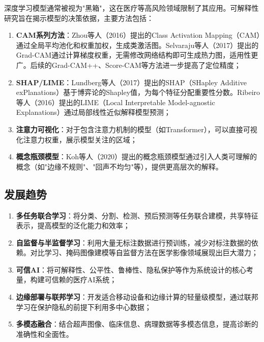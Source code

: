 \documentclass[supercite]{Hust-undergraduate-kaiti}
\theoremstyle{definition}
\begin{document}
深度学习模型通常被视为"黑箱"，这在医疗等高风险领域限制了其应用。可解释性研究旨在揭示模型的决策依据，主要方法包括：

\begin{enumerate}
    \item \textbf{CAM系列方法}：Zhou等人（2016）提出的Class Activation Mapping（CAM）通过全局平均池化和权重加权，生成类激活图。Selvaraju等人（2017）提出的Grad-CAM\cite{ref5}通过计算梯度权重，无需修改网络结构即可生成热力图，适用性更广。后续的Grad-CAM++、Score-CAM等方法进一步提高了定位精度；
    
    \item \textbf{SHAP/LIME}：Lundberg等人（2017）提出的SHAP（SHapley Additive exPlanations）基于博弈论的Shapley值，为每个特征分配重要性分数。Ribeiro等人（2016）提出的LIME（Local Interpretable Model-agnostic Explanations）通过局部线性近似解释模型预测；
    
    \item \textbf{注意力可视化}：对于包含注意力机制的模型（如Transformer），可以直接可视化注意力权重，展示模型关注的区域；
    
    \item \textbf{概念瓶颈模型}：Koh等人（2020）提出的概念瓶颈模型通过引入人类可理解的概念（如"边缘不规则"、"回声不均匀"等），提供更高层次的解释。
\end{enumerate}

\subsection{发展趋势}

\begin{enumerate}
    \item \textbf{多任务联合学习}：将分类、分割、检测、预后预测等任务联合建模，共享特征表示，提高模型的泛化能力和效率；
    
    \item \textbf{自监督与半监督学习}：利用大量无标注数据进行预训练，减少对标注数据的依赖。对比学习、掩码图像建模等自监督方法在医学影像领域展现出巨大潜力；
    
    \item \textbf{可信AI}：将可解释性、公平性、鲁棒性、隐私保护等作为系统设计的核心考量，构建可信赖的医疗AI系统；
    
    \item \textbf{边缘部署与联邦学习}：开发适合移动设备和边缘计算的轻量级模型，通过联邦学习在保护隐私的前提下利用多中心数据；
    
    \item \textbf{多模态融合}：结合超声图像、临床信息、病理数据等多模态信息，提高诊断的准确性和全面性。
\end{enumerate}
\end{document}
